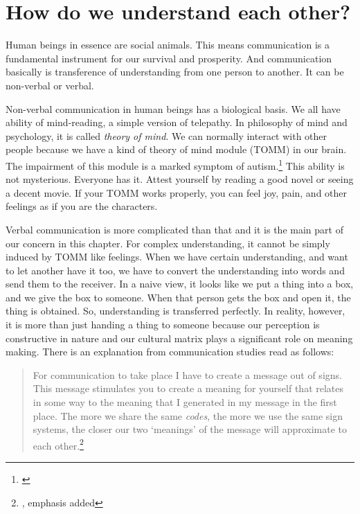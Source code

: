 \chapter{How do we understand each other?}\label{chap:howeach}

Human beings in essence are social animals. This means communication is a fundamental instrument for our survival and prosperity. And communication basically is transference of understanding from one person to another. It can be non-verbal or verbal.

Non-verbal communication in human beings has a biological basis. We all have ability of mind-reading, a simple version of telepathy. In philosophy of mind and psychology, it is called \emph{theory of mind}. We can normally interact with other people because we have a kind of theory of mind module (TOMM) in our brain. The impairment of this module is a marked symptom of autism.\footnote{\citealp[pp.~447ff]{baarsgage:cognition}} This ability is not mysterious. Everyone has it. Attest yourself by reading a good novel or seeing a decent movie. If your TOMM works properly, you can feel joy, pain, and other feelings as if you are the characters.

Verbal communication is more complicated than that and it is the main part of our concern in this chapter. For complex understanding, it cannot be simply induced by TOMM like feelings. When we have certain understanding, and want to let another have it too, we have to convert the understanding into words and send them to the receiver. In a naive view, it looks like we put a thing into a box, and we give the box to someone. When that person gets the box and open it, the thing is obtained. So, understanding is transferred perfectly. In reality, however, it is more than just handing a thing to someone because our perception is constructive in nature and our cultural matrix plays a significant role on meaning making. There is an explanation from communication studies read as follows:

\begin{quote}
For communication to take place I have to create a message out of signs. This message stimulates you to create a meaning for yourself that relates in some way to the meaning that I generated in my message in the first place. The more we share the same \emph{codes}, the more we use the same sign systems, the closer our two `meanings' of the message will approximate to each other.\footnote{\citealp[p.~39]{fiske:communication}, emphasis added}
\end{quote}

